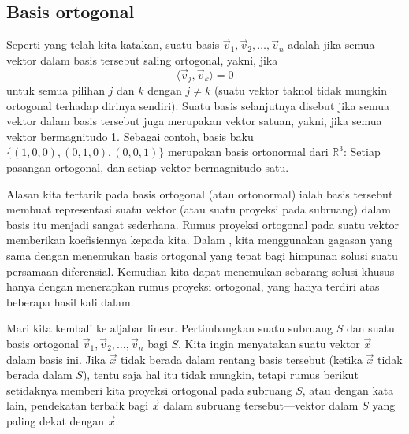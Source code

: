 \subsection{Basis ortogonal}

Seperti yang telah kita katakan, suatu basis $\vec{v}_1,\vec{v}_2,\ldots,\vec{v}_n$
adalah \emph{} jika semua vektor dalam
basis tersebut saling ortogonal, yakni, jika
\begin{equation*}
\langle \vec{v}_j , \vec{v}_k \rangle = 0
\end{equation*}
untuk semua pilihan $j$ dan $k$ dengan $j \neq k$ (suatu vektor taknol tidak mungkin
ortogonal terhadap dirinya sendiri).
Suatu basis selanjutnya disebut \emph{} jika semua
vektor dalam basis tersebut juga merupakan vektor satuan, yakni, jika semua vektor
bermagnitudo 1.
Sebagai contoh, basis baku $\{ (1,0,0), (0,1,0), (0,0,1) \}$ merupakan
basis ortonormal dari ${\mathbb{R}}^3$:
Setiap pasangan ortogonal, dan setiap vektor bermagnitudo
satu.

Alasan kita tertarik pada basis ortogonal (atau ortonormal) ialah
basis tersebut membuat representasi suatu vektor (atau suatu proyeksi pada
subruang) dalam basis itu menjadi sangat sederhana. Rumus proyeksi ortogonal
pada suatu vektor memberikan koefisiennya kepada kita. Dalam
, kita menggunakan gagasan yang sama dengan menemukan
basis ortogonal yang tepat bagi himpunan solusi suatu persamaan diferensial.
Kemudian kita dapat menemukan sebarang solusi khusus hanya dengan menerapkan
rumus proyeksi ortogonal, yang hanya terdiri atas beberapa hasil kali dalam.

Mari kita kembali ke aljabar linear. Pertimbangkan suatu subruang $S$
dan suatu basis ortogonal
$\vec{v}_1, \vec{v}_2, \ldots, \vec{v}_n$ bagi $S$.
Kita ingin
menyatakan suatu vektor $\vec{x}$ dalam basis ini.
Jika $\vec{x}$ tidak berada dalam rentang
basis tersebut (ketika $\vec{x}$ tidak berada dalam $S$),
tentu saja hal itu tidak mungkin,
tetapi rumus berikut
setidaknya memberi kita proyeksi ortogonal pada subruang $S$,
atau dengan kata lain, pendekatan terbaik
bagi $\vec{x}$ dalam subruang tersebut---vektor dalam $S$ yang paling dekat dengan $\vec{x}$.

